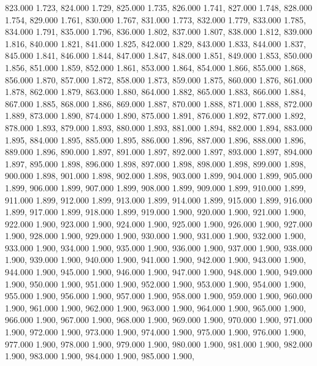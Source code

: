823.000 1.723, 
824.000 1.729, 
825.000 1.735, 
826.000 1.741, 
827.000 1.748, 
828.000 1.754, 
829.000 1.761, 
830.000 1.767, 
831.000 1.773, 
832.000 1.779, 
833.000 1.785, 
834.000 1.791, 
835.000 1.796, 
836.000 1.802, 
837.000 1.807, 
838.000 1.812, 
839.000 1.816, 
840.000 1.821, 
841.000 1.825, 
842.000 1.829, 
843.000 1.833, 
844.000 1.837, 
845.000 1.841, 
846.000 1.844, 
847.000 1.847, 
848.000 1.851, 
849.000 1.853, 
850.000 1.856, 
851.000 1.859, 
852.000 1.861, 
853.000 1.864, 
854.000 1.866, 
855.000 1.868, 
856.000 1.870, 
857.000 1.872, 
858.000 1.873, 
859.000 1.875, 
860.000 1.876, 
861.000 1.878, 
862.000 1.879, 
863.000 1.880, 
864.000 1.882, 
865.000 1.883, 
866.000 1.884, 
867.000 1.885, 
868.000 1.886, 
869.000 1.887, 
870.000 1.888, 
871.000 1.888, 
872.000 1.889, 
873.000 1.890, 
874.000 1.890, 
875.000 1.891, 
876.000 1.892, 
877.000 1.892, 
878.000 1.893, 
879.000 1.893, 
880.000 1.893, 
881.000 1.894, 
882.000 1.894, 
883.000 1.895, 
884.000 1.895, 
885.000 1.895, 
886.000 1.896, 
887.000 1.896, 
888.000 1.896, 
889.000 1.896, 
890.000 1.897, 
891.000 1.897, 
892.000 1.897, 
893.000 1.897, 
894.000 1.897, 
895.000 1.898, 
896.000 1.898, 
897.000 1.898, 
898.000 1.898, 
899.000 1.898, 
900.000 1.898, 
901.000 1.898, 
902.000 1.898, 
903.000 1.899, 
904.000 1.899, 
905.000 1.899, 
906.000 1.899, 
907.000 1.899, 
908.000 1.899, 
909.000 1.899, 
910.000 1.899, 
911.000 1.899, 
912.000 1.899, 
913.000 1.899, 
914.000 1.899, 
915.000 1.899, 
916.000 1.899, 
917.000 1.899, 
918.000 1.899, 
919.000 1.900, 
920.000 1.900, 
921.000 1.900, 
922.000 1.900, 
923.000 1.900, 
924.000 1.900, 
925.000 1.900, 
926.000 1.900, 
927.000 1.900, 
928.000 1.900, 
929.000 1.900, 
930.000 1.900, 
931.000 1.900, 
932.000 1.900, 
933.000 1.900, 
934.000 1.900, 
935.000 1.900, 
936.000 1.900, 
937.000 1.900, 
938.000 1.900, 
939.000 1.900, 
940.000 1.900, 
941.000 1.900, 
942.000 1.900, 
943.000 1.900, 
944.000 1.900, 
945.000 1.900, 
946.000 1.900, 
947.000 1.900, 
948.000 1.900, 
949.000 1.900, 
950.000 1.900, 
951.000 1.900, 
952.000 1.900, 
953.000 1.900, 
954.000 1.900, 
955.000 1.900, 
956.000 1.900, 
957.000 1.900, 
958.000 1.900, 
959.000 1.900, 
960.000 1.900, 
961.000 1.900, 
962.000 1.900, 
963.000 1.900, 
964.000 1.900, 
965.000 1.900, 
966.000 1.900, 
967.000 1.900, 
968.000 1.900, 
969.000 1.900, 
970.000 1.900, 
971.000 1.900, 
972.000 1.900, 
973.000 1.900, 
974.000 1.900, 
975.000 1.900, 
976.000 1.900, 
977.000 1.900, 
978.000 1.900, 
979.000 1.900, 
980.000 1.900, 
981.000 1.900, 
982.000 1.900, 
983.000 1.900, 
984.000 1.900, 
985.000 1.900, 
